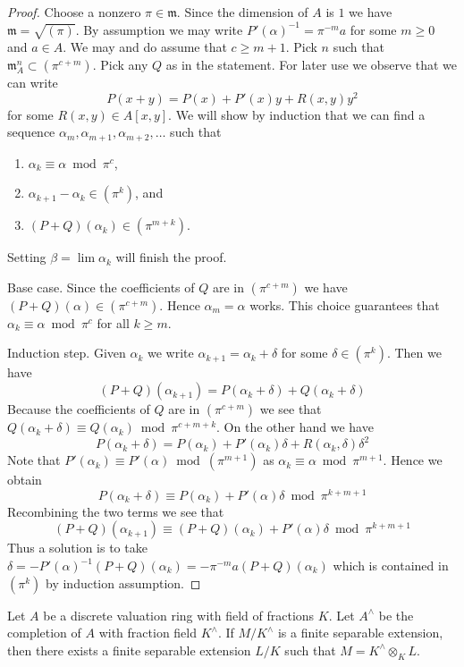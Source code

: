 \begin{proof}
Choose a nonzero $\pi \in \mathfrak m$. Since the dimension of $A$ is $1$
we have $\mathfrak m = \sqrt{(\pi)}$. By assumption we may write
$P'(\alpha)^{-1} = \pi^{-m} a$ for some $m \geq 0$ and $a \in A$.
We may and do assume that $c \geq m + 1$.
Pick $n$ such that $\mathfrak m_A^n \subset (\pi^{c + m})$.
Pick any $Q$ as in the statement. For later use we observe that we can write
$$
P(x + y) = P(x) + P'(x)y + R(x, y)y^2
$$
for some $R(x, y) \in A[x, y]$. We will show by induction that we can find a
sequence $\alpha_m, \alpha_{m + 1}, \alpha_{m + 2}, \ldots$ such that
\begin{enumerate}
\item $\alpha_k \equiv \alpha \bmod \pi^c$,
\item $\alpha_{k + 1} - \alpha_k \in (\pi^k)$, and
\item $(P + Q)(\alpha_k) \in (\pi^{m + k})$.
\end{enumerate}
Setting $\beta = \lim \alpha_k$ will finish the proof.

\medskip\noindent
Base case. Since the coefficients of $Q$ are in $(\pi^{c + m})$ we have
$(P + Q)(\alpha) \in (\pi^{c + m})$. Hence $\alpha_m = \alpha$ works.
This choice guarantees that $\alpha_k \equiv \alpha \bmod \pi^c$
for all $k \geq m$.

\medskip\noindent
Induction step. Given $\alpha_k$ we write
$\alpha_{k + 1} = \alpha_k + \delta$ for some $\delta \in (\pi^k)$.
Then we have
$$
(P + Q)(\alpha_{k + 1}) =
P(\alpha_k + \delta) + Q(\alpha_k + \delta)
$$
Because the coefficients of $Q$ are in $(\pi^{c + m})$ we see that
$Q(\alpha_k + \delta) \equiv Q(\alpha_k) \bmod \pi^{c + m + k}$.
On the other hand we have
$$
P(\alpha_k + \delta) =
P(\alpha_k) + P'(\alpha_k)\delta + R(\alpha_k, \delta)\delta^2
$$
Note that $P'(\alpha_k) \equiv P'(\alpha) \bmod (\pi^{m + 1})$
as $\alpha_k \equiv \alpha \bmod \pi^{m + 1}$. Hence we obtain
$$
P(\alpha_k + \delta) \equiv P(\alpha_k) + P'(\alpha) \delta
\bmod \pi^{k + m + 1}
$$
Recombining the two terms we see that
$$
(P + Q)(\alpha_{k + 1}) \equiv (P + Q)(\alpha_k) + P'(\alpha) \delta
\bmod \pi^{k + m + 1}
$$
Thus a solution is to take
$\delta = -P'(\alpha)^{-1} (P + Q)(\alpha_k) =  - \pi^{-m} a (P + Q)(\alpha_k)$
which is contained in $(\pi^k)$ by induction assumption.
\end{proof}

\begin{lemma}
\label{lemma-approximate-separable-extension}
Let $A$ be a discrete valuation ring with field of fractions $K$.
Let $A^\wedge$ be the completion of $A$ with fraction field $K^\wedge$.
If $M/K^\wedge$ is a finite separable extension, then
there exists a finite separable extension $L/K$
such that $M = K^\wedge \otimes_K L$.
\end{lemma}

